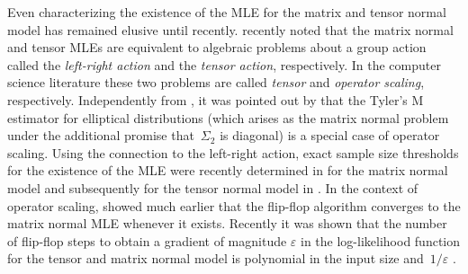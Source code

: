 \documentclass[aos]{imsart}
\theoremstyle{definition}
\numberwithin{equation}{section}
\newcommand{\eps}{\varepsilon}
\newcommand{\CF}[1]{{\color{purple}[CF: #1]}}
\begin{document}
Even characterizing the existence of the MLE for the matrix and tensor normal model has remained elusive until recently.
\cite{amendola2020invariant} recently noted that the matrix normal and tensor MLEs are equivalent to algebraic problems about a group action called the \emph{left-right action} and the \emph{tensor action}, respectively.
In the computer science literature these two problems are called \emph{tensor} and \emph{operator scaling}, respectively.
Independently from \cite{amendola2020invariant}, it was pointed out by \cite{FM20} that the Tyler's M estimator for elliptical distributions (which arises as the matrix normal problem under the additional promise that~$\Sigma_2$ is diagonal) is a special case of operator scaling.
Using the connection to the left-right action, exact sample size thresholds for the existence of the MLE were recently determined in \cite{derksen2020matrix} for the matrix normal model and subsequently for the tensor normal model in \cite{derksen2020tensor}.
In the context of operator scaling, \cite{gurvits2004classical} showed much earlier that the flip-flop algorithm converges to the matrix normal MLE whenever it exists.
Recently it was shown that the number of flip-flop steps to obtain a gradient of magnitude $\eps$ in the log-likelihood function for the tensor and matrix normal model is polynomial in the input size and~$1/\eps$ \citep{GGOW19,burgisser2017alternating,burgisser2019towards}.


\end{document}
